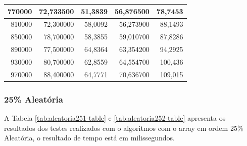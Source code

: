 \documentclass[a4paper, 12pt]{article}
\begin{document}
\begin{longtable}[c]{@{}rrrrr@{}}
	\multicolumn{1}{|r|}{770000}                  & \multicolumn{1}{r|}{72,733500}     & \multicolumn{1}{r|}{51,3839}       & \multicolumn{1}{r|}{56,876500}     & \multicolumn{1}{r|}{78,7453}       \\* \midrule
	\multicolumn{1}{|r|}{810000}                  & \multicolumn{1}{r|}{72,300000}     & \multicolumn{1}{r|}{58,0092}       & \multicolumn{1}{r|}{56,273900}     & \multicolumn{1}{r|}{88,1493}       \\* \midrule
	\multicolumn{1}{|r|}{850000}                  & \multicolumn{1}{r|}{78,700000}     & \multicolumn{1}{r|}{58,3855}       & \multicolumn{1}{r|}{59,010700}     & \multicolumn{1}{r|}{87,8286}       \\* \midrule
	\multicolumn{1}{|r|}{890000}                  & \multicolumn{1}{r|}{77,500000}     & \multicolumn{1}{r|}{64,8364}       & \multicolumn{1}{r|}{63,354200}     & \multicolumn{1}{r|}{94,2925}       \\* \midrule
	\multicolumn{1}{|r|}{930000}                  & \multicolumn{1}{r|}{80,700000}     & \multicolumn{1}{r|}{62,8559}       & \multicolumn{1}{r|}{64,554700}     & \multicolumn{1}{r|}{100,436}       \\* \midrule
	\multicolumn{1}{|r|}{970000}                  & \multicolumn{1}{r|}{88,400000}     & \multicolumn{1}{r|}{64,7771}       & \multicolumn{1}{r|}{70,636700}     & \multicolumn{1}{r|}{109,015}       \\* \bottomrule
\end{longtable}
\subsubsection{25\% Aleatória}
A Tabela \ref{tab:aleatoria251-table} e \ref{tab:aleatoria252-table}  apresenta os resultados dos testes realizados com o algoritmos com o array em ordem 25\% Aleatória, o resultado de tempo está em milissegundos.
\end{document}

